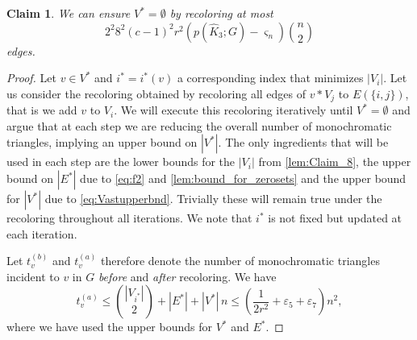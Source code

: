 \documentclass[a4paper,11pt]{article}
\newtheorem{claim}[theorem]{Claim}
\numberwithin{equation}{section}
\begin{document}
\begin{claim}\label{lem:V_star_is_zero}
    We can ensure $V^\ast = \emptyset$ by recoloring at most
    \begin{equation*}
    2^2 8^2(c-1)^2r^2(p(\hat K_3; G)-\varsigma_n)\binom{n}{2}
    \end{equation*}
   edges.
\end{claim}
%
\begin{proof}
    Let $v \in V^\ast$ and $i^\ast = i^\ast(v)$ a corresponding index that minimizes $|V_i|$. Let us consider the recoloring obtained by recoloring all edges of $v\ast V_j$ to $E(\{i,j\})$, that is we add $v$ to $V_i$. We will execute this recoloring iteratively until $V^\ast = \emptyset$ and argue that at each step we are reducing the overall number of monochromatic triangles, implying an upper bound on $|V^\ast|$. The only ingredients that will be used in each step are the lower bounds for the $|V_i|$ from \cref{lem:Claim_8}, the upper bound on $|E^\ast|$ due to \cref{eq:f2} and \cref{lem:bound_for_zerosets}
    and the upper bound for $|V^\ast|$ due to \cref{eq:Vastupperbnd}.
    Trivially these will remain true under the recoloring throughout all iterations. We note that $i^\ast$ is not fixed but updated at each iteration.
    
    Let $t_v^{(b)}$ and $t_v^{(a)}$ therefore denote the number of monochromatic triangles incident to $v$ in $G$ \emph{before} and \emph{after} recoloring. We have
    \begin{equation}\label{eq:triangle_upper_bound}
        t_v^{(a)} \leq \binom{|V_{i^\ast}|}{2}   + |E^\ast| + |V^\ast| \, n
        \le
        \left(\frac{1}{2r^2}+\varepsilon_5+\varepsilon_7\right)n^2,
    \end{equation}
    where we have used the upper bounds for $V^*$ and  $E^*$.%



\end{proof}
\end{document}
